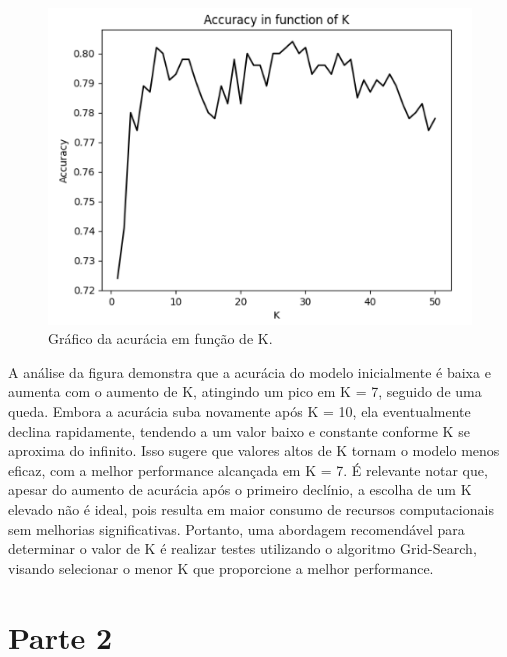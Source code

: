 \documentclass{article} %
\begin{document}
\begin{figure}[h] %
    \centering %
    \includegraphics[width=1\linewidth]{graphic_k.png} %
    \caption{Gráfico da acurácia em função de K.} %
    \label{fig:exemplo} %
\end{figure}

\vspace{1cm}

A análise da figura demonstra que a acurácia do modelo inicialmente é baixa e aumenta com o aumento de K, atingindo um pico em K = 7, seguido de uma queda. Embora a acurácia suba novamente após K = 10, ela eventualmente declina rapidamente, tendendo a um valor baixo e constante conforme K se aproxima do infinito. Isso sugere que valores altos de K tornam o modelo menos eficaz, com a melhor performance alcançada em K = 7. É relevante notar que, apesar do aumento de acurácia após o primeiro declínio, a escolha de um K elevado não é ideal, pois resulta em maior consumo de recursos computacionais sem melhorias significativas. Portanto, uma abordagem recomendável para determinar o valor de K é realizar testes utilizando o algoritmo Grid-Search, visando selecionar o menor K que proporcione a melhor performance.

\newpage

\section{Parte 2}
\end{document}
